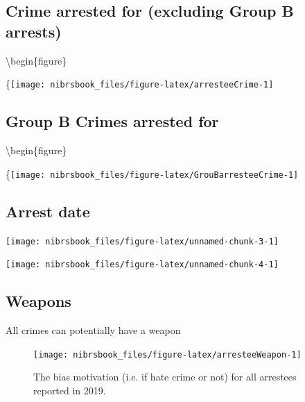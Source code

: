 \documentclass[
  12pt,
  openany]{book}
\begin{document}
\hypertarget{crime-arrested-for-excluding-group-b-arrests}{%
\subsection{Crime arrested for (excluding Group B arrests)}\label{crime-arrested-for-excluding-group-b-arrests}}

\textbackslash begin\{figure\}

\{\centering \texttt{[image: nibrsbook\_files/figure-latex/arresteeCrime-1]}

\hypertarget{group-b-crimes-arrested-for}{%
\subsection{Group B Crimes arrested for}\label{group-b-crimes-arrested-for}}

\textbackslash begin\{figure\}

\{\centering \texttt{[image: nibrsbook\_files/figure-latex/GrouBarresteeCrime-1]}

\hypertarget{arrest-date}{%
\subsection{Arrest date}\label{arrest-date}}

\begin{center}\texttt{[image: nibrsbook\_files/figure-latex/unnamed-chunk-3-1]} \end{center}

\begin{center}\texttt{[image: nibrsbook\_files/figure-latex/unnamed-chunk-4-1]} \end{center}

\hypertarget{weapons-1}{%
\subsection{Weapons}\label{weapons-1}}

All crimes can potentially have a weapon

\begin{figure}

{\centering \texttt{[image: nibrsbook\_files/figure-latex/arresteeWeapon-1]} 

}

\caption{The bias motivation (i.e. if hate crime or not) for all arrestees reported in 2019.}\label{fig:arresteeWeapon}
\end{figure}
\end{document}
